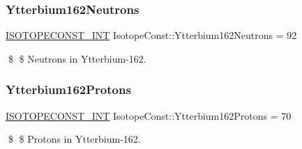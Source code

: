 \subsubsection{\texorpdfstring{Ytterbium162\+Neutrons}{Ytterbium162Neutrons}}
{\footnotesize\ttfamily \mbox{\hyperlink{group___isotope_const-_macros_ga5f18360b3e99483a35c32d789e62621c}{I\+S\+O\+T\+O\+P\+E\+C\+O\+N\+S\+T\+\_\+\+I\+NT}} Isotope\+Const\+::\+Ytterbium162\+Neutrons = 92}

\$ \$ Neutrons in Ytterbium-\/162. \mbox{\label{group___isotope_const-_ytterbium-_yb162_gae9fe6c182e53004c0f2009cdf47e2786}} 
\subsubsection{\texorpdfstring{Ytterbium162\+Protons}{Ytterbium162Protons}}
{\footnotesize\ttfamily \mbox{\hyperlink{group___isotope_const-_macros_ga5f18360b3e99483a35c32d789e62621c}{I\+S\+O\+T\+O\+P\+E\+C\+O\+N\+S\+T\+\_\+\+I\+NT}} Isotope\+Const\+::\+Ytterbium162\+Protons = 70}

\$ \$ Protons in Ytterbium-\/162. 